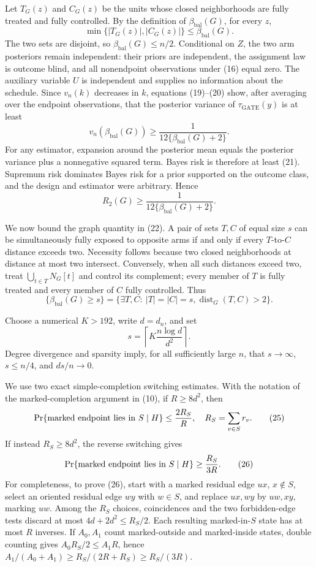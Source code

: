 Let \(T_G(z)\) and \(C_G(z)\) be the units whose closed neighborhoods are
fully treated and fully controlled.  By the definition of
\(\beta_{\mathrm{bal}}(G)\), for every \(z\),
\[
\min\{|T_G(z)|,|C_G(z)|\}\le\beta_{\mathrm{bal}}(G).
\tag{20}
\]
The two sets are disjoint, so \(\beta_{\mathrm{bal}}(G)\le n/2\).
Conditional on \(Z\), the two arm posteriors remain independent: their
priors are independent, the assignment law is outcome blind, and all
nonendpoint observations under (16) equal zero.  The auxiliary variable
\(U\) is independent and supplies no information about the schedule.
Since \(v_n(k)\) decreases in \(k\), equations (19)--(20) show, after
averaging over the endpoint observations, that the posterior variance of
\(\tau_{\mathrm{GATE}}(y)\) is at least
\[
v_n(\beta_{\mathrm{bal}}(G))
\ge\frac1{12\{\beta_{\mathrm{bal}}(G)+2\}}.
\tag{21}
\]
For any estimator, expansion around the posterior mean equals the posterior
variance plus a nonnegative squared term.  Bayes risk is therefore at
least (21).  Supremum risk dominates Bayes risk for a prior supported on
the outcome class, and the design and estimator were arbitrary.  Hence
\[
R_2(G)\ge\frac1{12\{\beta_{\mathrm{bal}}(G)+2\}}.
\tag{22}
\]

We now bound the graph quantity in (22).  A pair of sets \(T,C\) of equal
size \(s\) can be simultaneously fully exposed to opposite arms if and
only if every \(T\)-to-\(C\) distance exceeds two.  Necessity follows
because two closed neighborhoods at distance at most two intersect.
Conversely, when all such distances exceed two, treat
\(\bigcup_{t\in T}N_G[t]\) and control its complement; every member of
\(T\) is fully treated and every member of \(C\) fully controlled.  Thus
\[
\{\beta_{\mathrm{bal}}(G)\ge s\}
=\{\exists T,C:\ |T|=|C|=s, \operatorname{dist}_G(T,C)>2\}.
\tag{23}
\]

Choose a numerical \(K>192\), write \(d=d_n\), and set
\[
s=\left\lceil K\frac{n\log d}{d^2}\right\rceil.
\tag{24}
\]
Degree divergence and sparsity imply, for all sufficiently large \(n\),
that \(s\to\infty\), \(s\le n/4\), and \(ds/n\to0\).

We use two exact simple-completion switching estimates.  With the notation
of the marked-completion argument in (10), if \(R\ge8d^2\), then
\[
\Pr\{\hbox{marked endpoint lies in }S\mid H\}
\le\frac{2R_S}{R},\quad R_S=\sum_{v\in S}r_v.
\tag{25}
\]
If instead \(R_S\ge8d^2\), the reverse switching gives
\[
\Pr\{\hbox{marked endpoint lies in }S\mid H\}
\ge\frac{R_S}{3R}.
\tag{26}
\]
For completeness, to prove (26), start with a marked residual edge
\(ux\), \(x\notin S\), select an oriented residual edge \(wy\) with
\(w\in S\), and replace \(ux,wy\) by \(uw,xy\), marking \(uw\).
Among the \(R_S\) choices, coincidences and the two forbidden-edge tests
discard at most \(4d+2d^2\le R_S/2\).  Each resulting marked-in-\(S\)
state has at most \(R\) inverses.  If \(A_0,A_1\) count marked-outside and
marked-inside states, double counting gives
\(A_0R_S/2\le A_1R\), hence
\(A_1/(A_0+A_1)\ge R_S/(2R+R_S)\ge R_S/(3R)\).

